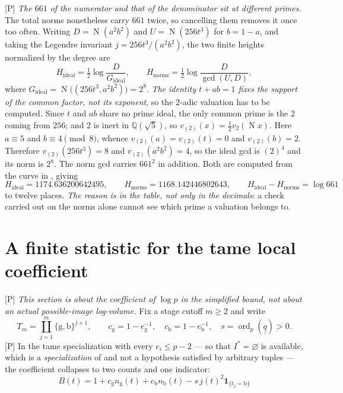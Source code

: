 \documentclass[11pt]{article}
\theoremstyle{plain}
\theoremstyle{definition}
\newcommand{\ord}{\operatorname{ord}}
\newcommand{\Norm}{\operatorname{N}}
\begin{document}
\textup{[P]} \emph{The $661$ of the numerator and that of the denominator sit at
different primes.}  The total norms nonetheless carry $661$ twice, so cancelling them
removes it once too often.  Writing $D=\Norm(a^{2}b^{2})$ and $U=\Norm(256t^{3})$ for
$b=1-a$, and taking the Legendre invariant $j=256t^{3}/(a^{2}b^{2})$, the two finite
heights normalized by the degree are
\[
  H_{\mathrm{ideal}}=\tfrac12\log\frac{D}{G_{\mathrm{ideal}}},\qquad
  H_{\mathrm{norms}}=\tfrac12\log\frac{D}{\gcd(U,D)} ,
\]
where $G_{\mathrm{ideal}}=\Norm\bigl((256t^{3},a^{2}b^{2})\bigr)=2^{8}$.
\emph{The identity $t+ab=1$ fixes the support of the common factor, not its exponent},
so the $2$-adic valuation has to be computed.  Since $t$ and $ab$ share no prime ideal,
the only common prime is the $2$ coming from $256$; and $2$ is inert in
$\mathbb{Q}(\sqrt5)$, so $v_{(2)}(x)=\tfrac12 v_2(\Norm x)$.  Here $a\equiv5$ and
$b\equiv4\pmod 8$, whence $v_{(2)}(a)=v_{(2)}(t)=0$ and $v_{(2)}(b)=2$.  Therefore
$v_{(2)}(256t^{3})=8$ and $v_{(2)}(a^{2}b^{2})=4$, so the ideal gcd is $(2)^{4}$ and its
norm is $2^{8}$.  The norm gcd carries $661^{2}$ in
addition.  Both are computed from the curve in , giving
\[
  H_{\mathrm{ideal}}=1174.636200642495,\qquad
  H_{\mathrm{norms}}=1168.142446802643,\qquad
  H_{\mathrm{ideal}}-H_{\mathrm{norms}}=\log661
\]
to twelve places.  \emph{The reason is in the table, not only in the decimals}: a
check carried out on the norms alone cannot see which prime a valuation
belongs to.

\section{A finite statistic for the tame local coefficient}\label{s:statistic}

\textup{[P]} \emph{This section is about the coefficient of $\log p$ in the simplified
bound, not about an actual possible-image log-volume.}  Fix a stage cutoff $m\ge2$ and
write
\[
 T_m=\coprod_{j=1}^{m}\{\mathrm g,\mathrm b\}^{j+1},\qquad
 c_{\mathrm g}=1-e_{\mathrm g}^{-1},\quad c_{\mathrm b}=1-e_{\mathrm b}^{-1},\quad
 s=\ord_p(\underline{\underline q})>0 .
\]
\textup{[P]} In the tame specialization with every $e_i\le p-2$ --- so that
$I^{*}=\varnothing$ is available, which is a \emph{specialization} of
\cite[Prop.~1.4(iii)]{IUT4} and not a hypothesis satisfied by arbitrary tuples --- the
coefficient collapses to two counts and one indicator:
\[
 \boxed{\;B(t)=1+c_{\mathrm g}n_{\mathrm g}(t)+c_{\mathrm b}n_{\mathrm b}(t)
        -s\,j(t)^2\mathbf 1_{\{t_j=\mathrm b\}}\;}
\]
\end{document}
